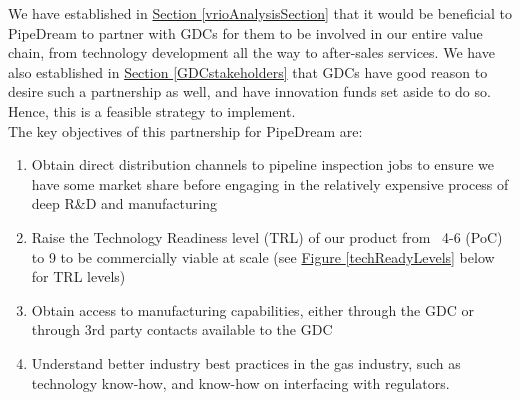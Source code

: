\documentclass[11pt]{article}		%
\newcommand{\figref}[1]{\hyperref[#1]{Figure \ref*{#1}}}    %
\newcommand{\sectref}[1]{\hyperref[#1]{Section \ref*{#1}}}     %
\begin{document}
    	We have established in \sectref{vrioAnalysisSection} that it would be beneficial to PipeDream to partner with GDCs for them to be involved in our entire value chain, from technology development all the way to after-sales services. We have also established in \sectref{GDCstakeholders} that GDCs have good reason to desire such a partnership as well, and have innovation funds set aside to do so. Hence, this is a feasible strategy to implement.
    	\\ 
	    \hspace*{3ex}The key objectives of this partnership for PipeDream are:
        \begin{enumerate}
        \item Obtain direct distribution channels to pipeline inspection jobs to ensure we have some market share before engaging in the relatively expensive process of deep R\&D and manufacturing
        \item Raise the Technology Readiness level (TRL) of our product from ~4-6 (PoC) to 9 to be commercially viable at scale (see \figref{techReadyLevels} below for TRL levels)
        \item Obtain access to manufacturing capabilities, either through the GDC or through 3rd party contacts available to the GDC
        \item Understand better industry best practices in the gas industry, such as technology know-how, and know-how on interfacing with regulators. 
        \end{enumerate}
\end{document}
